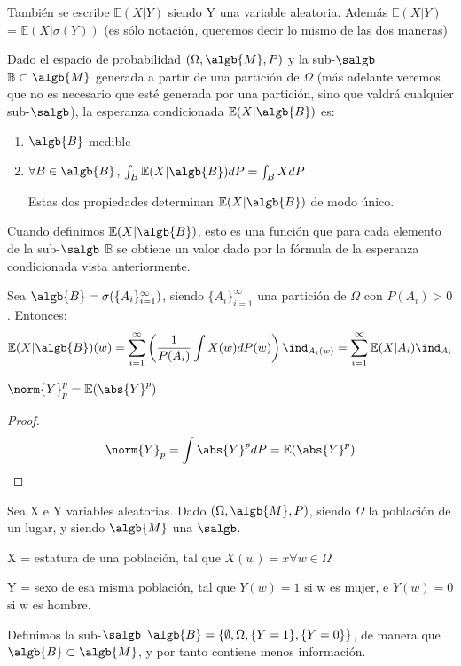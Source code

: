 \documentclass{apuntes}
\begin{document}
\obs También se escribe $\mathbb{E}(X|Y)$ siendo Y una variable aleatoria. Además $\mathbb{E}(X|Y)$ = $\mathbb{E}(X|\sigma(Y))$ (es sólo notación, queremos decir lo mismo de las dos maneras)


\begin{defn}
Dado el espacio de probabilidad $(\Omega, \algb{M}, P)$ y la sub-$\salgb$ $\mathbb{B}\subset\algb{M}$ generada a partir de una partición de $\Omega$ (más adelante veremos que no es necesario que esté generada por una partición, sino que valdrá cualquier  sub-$\salgb$), la esperanza condicionada $\mathbb{E}(X|\algb{B})$ es:
\begin{enumerate}
\item $\algb{B}$-medible
\item $\forall B \in \algb{B}$, $\int_{B}\mathbb{E}(X|\algb{B})dP=\int_{B}XdP$

Estas dos propiedades determinan $\mathbb{E}(X|\algb{B})$ de modo único.
\end{enumerate}
\end{defn}

\obs Cuando definimos $\mathbb{E}(X|\algb{B})$, esto es una función que para cada elemento de la sub-$\salgb$ $\mathbb{B}$ se obtiene un valor dado por la fórmula de la esperanza condicionada vista anteriormente.

\obs Sea $\algb{B}=\sigma(\{A_i\}_{i=1}^{\infty})$, siendo $\{A_i\}_{i=1}^{\infty}$ una partición de $\Omega$ con $P(A_i)>0$. Entonces:
\[
\mathbb{E}(X|\algb{B})(w)=\sum_{i=1}^{\infty}\left( \frac{1}{P(A_i)}\int X(w)dP(w)\right)\ind_{A_i(w)}=\sum_{i=1}^{\infty}\mathbb{E}(X|A_i) \ind_{A_i}
\]

\obs $\norm{Y}_p^p = \mathbb{E}(\abs{Y}^p)$
\begin{proof}
\[
\norm{Y}_p = \int \abs{Y}^pdP =\mathbb{E}(\abs{Y}^p)
\]
\end{proof}



\begin{example}
Sea X e Y variables aleatorias. Dado $(\Omega, \algb{M}, P)$, siendo $\Omega$ la población de un lugar, y siendo $\algb{M}$ una $\salgb$.

X = estatura de una población, tal que $X(w)=x \forall w \in \Omega$

Y = sexo de esa misma población, tal que $Y(w)=1$ si w es mujer, e $Y(w)=0$ si w es hombre.

Definimos la sub-$\salgb$ $\algb{B}=\{\emptyset, \Omega, \{Y=1\}, \{Y=0\}\}$, de manera que $\algb{B} \subset \algb{M}$, y por tanto contiene menos información.
\end{example}
\end{document}
